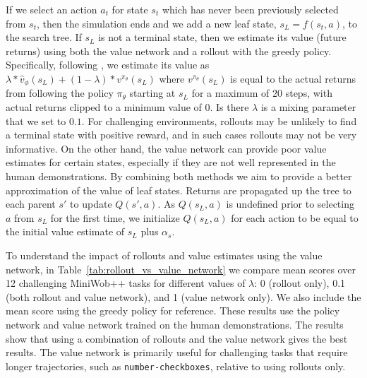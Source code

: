 If we select an action $a_t$ for state $s_t$ which has never been previously selected from $s_t$, then the simulation ends and we add a new leaf state, $s_L = f(s_t,a)$, to the search tree. If $s_L$ is not a terminal state, then we estimate its value (\ie future returns) using both the value network and a rollout with the greedy policy. Specifically, following \citet{silver2017mastering}, we estimate its value as $\lambda * \hat{v}_\phi(s_L) + (1 - \lambda) * v^{\pi_\theta}(s_L)$ where $v^{\pi_\theta}(s_L)$ is equal to the actual returns from following the policy $\pi_\theta$ starting at $s_L$ for a maximum of $20$ steps, with actual returns clipped to a minimum value of $0$.
Is there $\lambda$ is a mixing parameter that we set to $0.1$. For challenging environments, rollouts may be unlikely to find a terminal state with positive reward, and in such cases rollouts may not be very informative. On the other hand, the value network can provide poor value estimates for certain states, especially if they are not well represented in the human demonstrations. By combining both methods we aim to provide a better approximation of the value of leaf states. Returns are propagated up the tree to each parent $s'$ to update $Q(s',a)$. As $Q(s_L,a)$ is undefined prior to selecting $a$ from $s_L$ for the first time, we initialize $Q(s_L,a)$ for each action to be equal to the initial value estimate of $s_L$ plus $\alpha_s$.

To understand the impact of rollouts and value estimates using the value network, in Table~\ref{tab:rollout_vs_value_network} we compare mean scores over 12 challenging MiniWob++ tasks for different values of $\lambda$: 0 (rollout only), 0.1 (both rollout and value network), and 1 (value network only). We also include the mean score using the greedy policy for reference. These results use the policy network and value network trained on the human demonstrations. The results show that using a combination of rollouts and the value network gives the best results. The value network is primarily useful for challenging tasks that require longer trajectories, such as \texttt{number-checkboxes}, relative to using rollouts only.

\begin{table}[h!]
\centering

\vspace{0.07 in}
\caption{Mean scores for different policies over 12 challenging MiniWob++ tasks.}
\label{tab:rollout_vs_value_network}
\end{table}


